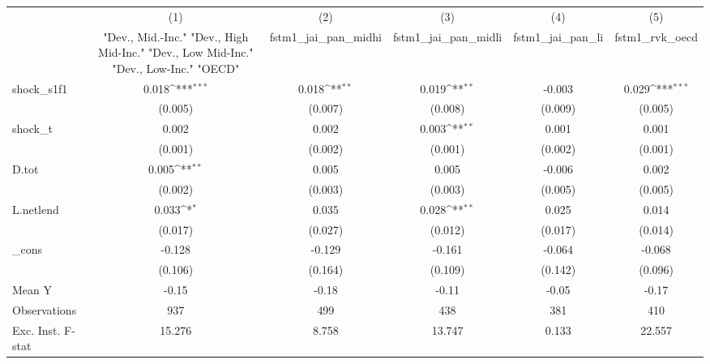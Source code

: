 {
\def\sym#1{\ifmmode^{#1}\else\(^{#1}\)\fi}
\begin{tabular}{l*{5}{c}}
\toprule
            &\multicolumn{1}{c}{(1)}&\multicolumn{1}{c}{(2)}&\multicolumn{1}{c}{(3)}&\multicolumn{1}{c}{(4)}&\multicolumn{1}{c}{(5)}\\
            &\multicolumn{1}{c}{ "Dev., Mid.-Inc." "Dev., High Mid-Inc." "Dev., Low Mid-Inc." "Dev., Low-Inc." "OECD" }&\multicolumn{1}{c}{fstm1\_jai\_pan\_midhi}&\multicolumn{1}{c}{fstm1\_jai\_pan\_midli}&\multicolumn{1}{c}{fstm1\_jai\_pan\_li}&\multicolumn{1}{c}{fstm1\_rvk\_oecd}\\
\midrule
shock\_s1f1  &       0.018\sym{***}&       0.018\sym{**} &       0.019\sym{**} &      -0.003         &       0.029\sym{***}\\
            &     (0.005)         &     (0.007)         &     (0.008)         &     (0.009)         &     (0.005)         \\
\addlinespace
shock\_t     &       0.002         &       0.002         &       0.003\sym{**} &       0.001         &       0.001         \\
            &     (0.001)         &     (0.002)         &     (0.001)         &     (0.002)         &     (0.001)         \\
\addlinespace
D.tot       &       0.005\sym{**} &       0.005         &       0.005         &      -0.006         &       0.002         \\
            &     (0.002)         &     (0.003)         &     (0.003)         &     (0.005)         &     (0.005)         \\
\addlinespace
L.netlend   &       0.033\sym{*}  &       0.035         &       0.028\sym{**} &       0.025         &       0.014         \\
            &     (0.017)         &     (0.027)         &     (0.012)         &     (0.017)         &     (0.014)         \\
\addlinespace
\_cons      &      -0.128         &      -0.129         &      -0.161         &      -0.064         &      -0.068         \\
            &     (0.106)         &     (0.164)         &     (0.109)         &     (0.142)         &     (0.096)         \\
\midrule
Mean Y      &       -0.15         &       -0.18         &       -0.11         &       -0.05         &       -0.17         \\
Observations&         937         &         499         &         438         &         381         &         410         \\
Exc. Inst. F-stat&      15.276         &       8.758         &      13.747         &       0.133         &      22.557         \\
\bottomrule
\end{tabular}
}
